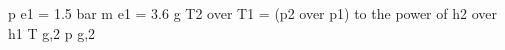 p e1 = 1.5 bar  
m e1 = 3.6 g  
T2 over T1 = (p2 over p1) to the power of h2 over h1  
T g,2  
p g,2